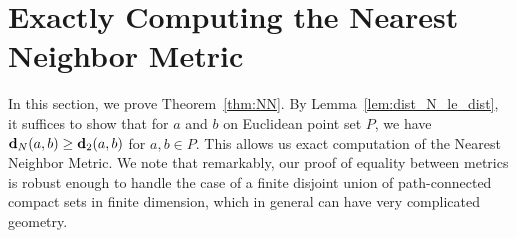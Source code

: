 \section{Exactly Computing the Nearest Neighbor Metric}
\label{sec:NN}
In this section, we prove Theorem~\ref{thm:NN}. By
Lemma~\ref{lem:dist_N_le_dist}, it suffices to show that for $a$ and $b$
on Euclidean point set $P$, we have $\mathbf{d}_N(a, b) \geq \mathbf{d}_2(a,b)$ for $a, b
\in P$. This allows us exact computation of the Nearest Neighbor Metric. We
note that remarkably, our proof of equality between metrics is robust
enough to handle the case of a finite disjoint union of path-connected
compact sets in finite dimension, which in general can have very
complicated geometry.

